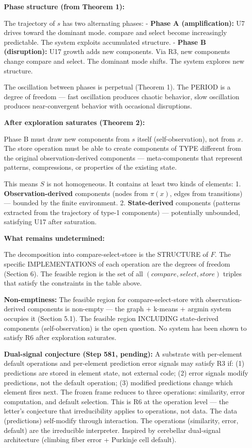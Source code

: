\documentclass[
  11pt,
]{article}
\begin{document}
\textbf{Phase structure (from Theorem 1):}

The trajectory of \(s\) has two alternating phases: - \textbf{Phase A
(amplification):} U7 drives toward the dominant mode. compare and select
become increasingly predictable. The system exploits accumulated
structure. - \textbf{Phase B (disruption):} U17 growth adds new
components. Via R3, new components change compare and select. The
dominant mode shifts. The system explores new structure.

The oscillation between phases is perpetual (Theorem 1). The PERIOD is a
degree of freedom --- fast oscillation produces chaotic behavior, slow
oscillation produces near-convergent behavior with occasional
disruptions.

\textbf{After exploration saturates (Theorem 2):}

Phase B must draw new components from \(s\) itself (self-observation),
not from \(x\). The store operation must be able to create components of
TYPE different from the original observation-derived components ---
meta-components that represent patterns, compressions, or properties of
the existing state.

This means \(S\) is not homogeneous. It contains at least two kinds of
elements: 1. \textbf{Observation-derived} components (nodes from
\(\pi(x)\), edges from transitions) --- bounded by the finite
environment. 2. \textbf{State-derived} components (patterns extracted
from the trajectory of type-1 components) --- potentially unbounded,
satisfying U17 after saturation.

\textbf{What remains undetermined:}

The decomposition into compare-select-store is the STRUCTURE of \(F\).
The specific IMPLEMENTATIONS of each operation are the degrees of
freedom (Section 6). The feasible region is the set of all
\((compare, select, store)\) triples that satisfy the constraints in the
table above.

\textbf{Non-emptiness:} The feasible region for compare-select-store
with observation-derived components is non-empty --- the graph + k-means
+ argmin system occupies it (Section 5.1). The feasible region INCLUDING
state-derived components (self-observation) is the open question. No
system has been shown to satisfy R6 after exploration saturates.

\textbf{Dual-signal conjecture (Step 581, pending):} A substrate with
per-element default operations and per-element prediction error signals
may satisfy R3 if: (1) predictions are stored in element state, not
external code; (2) error signals modify predictions, not the default
operation; (3) modified predictions change which element fires next. The
frozen frame reduces to three operations: similarity, error computation,
and default selection. This is R6 at the operation level --- the
letter's conjecture that irreducibility applies to operations, not data.
The data (predictions) self-modify through interaction. The operations
(similarity, error, default) are the irreducible interpreter. Inspired
by cerebellar dual-signal architecture (climbing fiber error + Purkinje
cell default).
\end{document}
